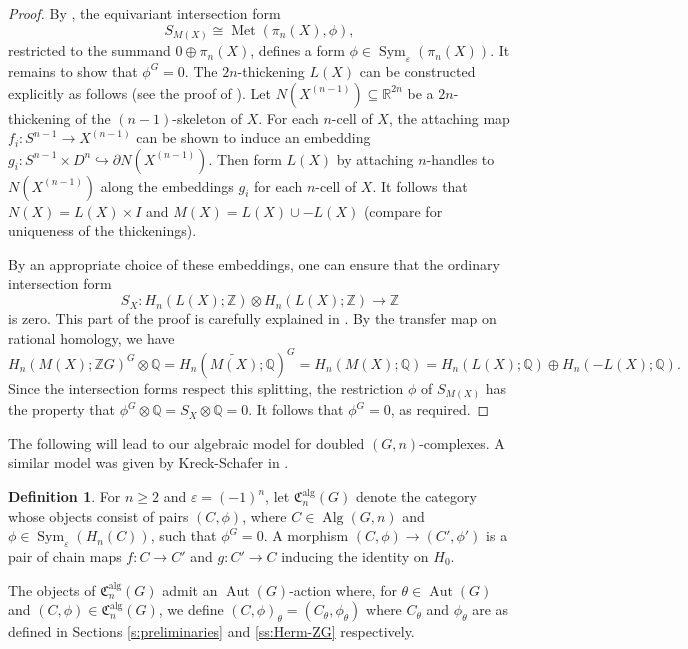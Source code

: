 \documentclass[11pt,a4paper,leqno]{amsart}
\theoremstyle{definition}
\newtheorem{definition}[theorem]{Definition}
\theoremstyle{remark}
\newcommand{\R}{\mathbb{R}}
\newcommand{\Z}{\mathbb{Z}}
\DeclareMathOperator{\Aut}{Aut}
\DeclareMathOperator{\Alg}{Alg}
\DeclareMathOperator{\alg}{alg}
\newcommand{\bZ}{\mathbb Z}
\newcommand{\bQ}{\mathbb Q}
\DeclareMathOperator{\Met}{Met}
\newcommand{\ep}{\varepsilon}
\newcommand{\bd}{\partial}
\DeclareMathOperator{\Sym}{Sym}
\begin{document}
\begin{proof} By \cite[Proposition II.4]{Kreck:1984}, the equivariant intersection form 
$$S_{M(X)}\cong \Met(\pi_n(X), \phi),$$
restricted to the  summand $0 \oplus \pi_n (X)$, defines a form $\phi \in \Sym_\ep(\pi_n(X))$. It remains to show that $\phi^G = 0$.
The  $2n$-thickening  $L(X)$ can be constructed explicitly as follows (see the proof of \cite[Proposition II.2 (i)]{Kreck:1984}).  Let $N(X^{(n-1)}) \subseteq \R ^{2n}$ be a $2n$-thickening of the $(n-1)$-skeleton of $X$. For each $n$-cell of $X$, the attaching map $f_i\colon  S^{n-1} \to X^{(n-1)}$ can be shown to induce an embedding $g_i\colon  S^{n-1} \times D^n \hookrightarrow \bd N(X^{(n-1)})$. Then form $L(X)$ by attaching $n$-handles to $N(X^{(n-1)})$ along the embeddings $g_i$ for each $n$-cell of $X$. It follows that $N(X) = L(X) \times I$ and $M(X) = L(X) \cup - L(X)$  (compare \cite[Lemma 3.3]{Hambleton:2009} for  uniqueness of the thickenings).

By an appropriate choice of these embeddings, one can ensure that the ordinary intersection form
$$S_X \colon H_n(L(X); \bZ) \otimes H_n(L(X); \bZ) \to \bZ$$
is zero.  This part of the proof is carefully explained in 
 \cite[Proposition II.4(ii), pp17-18]{Kreck:1984}. By the transfer map on rational homology, we have
$$H_n(M(X); \Z G)^G\otimes \bQ = H_n(\widetilde{M(X)};\bQ)^G = H_n(M(X); \bQ) = H_n(L(X); \bQ) \oplus H_n(-L(X); \bQ). $$
Since the intersection forms respect this splitting, the restriction $\phi$ of $S_{M(X)}$ has the property that $\phi^G \otimes \bQ = S_X \otimes \bQ = 0$. It follows that $\phi^G=0$, as required.
\end{proof}

The following will lead to our algebraic model for doubled $(G,n)$-complexes. A similar model was given by Kreck-Schafer in \cite[Section III.1]{Kreck:1984}.

\begin{definition} For $n \geq 2$ and $\ep = (-1)^n$, let $\mathfrak{C}^{\alg}_n(G)$ denote the category whose objects consist of pairs $(C, \phi)$, where $C \in \Alg(G,n)$  and $\phi \in \Sym_\ep(H_n(C))$, such that $\phi^G = 0$. A morphism $(C, \phi) \to (C', \phi')$ is a pair of 
chain maps $f\colon C \to C'$ and $g\colon C' \to C$ inducing the identity on $H_0$.

The objects of $\mathfrak{C}^{\alg}_n(G)$ admit an $\Aut(G)$-action where, for $\theta \in \Aut(G)$ and $(C,\phi) \in \mathfrak{C}^{\alg}_n(G)$, we define $(C,\phi)_\theta = (C_\theta, \phi_\theta)$ where $C_\theta$ and $\phi_\theta$ are as defined in Sections \ref{s:preliminaries} and \ref{ss:Herm-ZG} respectively.
\end{definition}
\end{document}
